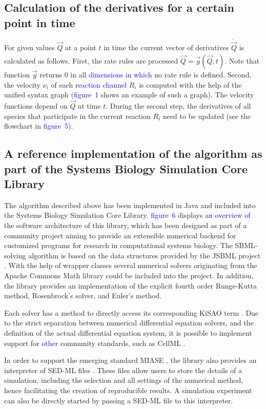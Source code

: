 \documentclass[10pt]{bmc_article}
\newenvironment{bmcformat}{\fussy\setboolean{publ}{true}}{\fussy}
\newcommand{\COR}[1]{\textcolor{blue}{#1}}
\begin{document}
\begin{bmcformat}
\subsection*{Calculation of the derivatives for a certain point in time}
For given values $\vec{Q}$ at a point $t$ in time the current vector of derivatives $\dot{\vec{Q}}$ is calculated as follows\COR{.}
First, the rate rules are processed $\dot{\vec{Q}} = \vec{g}(\vec{Q}, t)$. Note that function $\vec{g}$ returns 0 in all \COR{dimensions
in which} no rate rule is defined.
Second, the velocity $\nu_i$ of each \COR{reaction channel} $R_i$ is computed with the help of the unified syntax graph (\COR{figure~1} shows an example of such a graph).
The velocity functions depend on $\vec{Q}$ at time $t$.
During the second step\COR{,} the derivatives of all species that participate in the current reaction $R_i$ need to be updated (see the flowchart in \COR{figure~5}).

\subsection*{A reference implementation of the algorithm as part of the Systems
Biology Simulation Core Library}

The algorithm described above has been implemented in Java\texttrademark{} and
included into the Systems Biology Simulation Core Library.
\COR{figure~6} displays \COR{an overview of} the software architecture of this library, which
has been designed as part of a community project aiming to provide an extensible
numerical backend for customized programs for research in computational systems
biology.
The \acs{SBML}-solving algorithm is based on the data structures provided by the JSBML
project \cite{Draeger2008}.
With the help of wrapper classes several numerical solvers originating from the
Apache Commons Math library \COR{\cite{ApacheCommonsMath2013}} could be included into the project.
In addition, the library provides an implementation of the explicit fourth order
Runge-Kutta method, Rosenbrock's solver, and Euler's method.

Each solver has a method to directly access its corresponding \acf{KiSAO} term \cite{Courtot2011}.
Due to the strict separation between numerical differential equation solvers,
and the definition of the actual differential equation system, it is possible to
implement support for \COR{other} community standards, such as CellML
\cite{Lloyd2004}.

In order to support the emerging standard \acf{MIASE} \cite{Waltemath2011a}, the
library also provides an interpreter of \acf{SED-ML} files \cite{Waltemath2011}.
These files allow users to store the details of a simulation, including the
selection and all settings of the numerical method, hence facilitating the
creation of reproducible results.
A simulation experiment can also be directly started by passing a \acs{SED-ML} file to
this interpreter.


\end{bmcformat}
\end{document}
